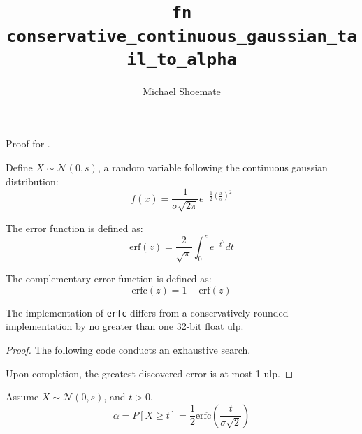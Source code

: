 \documentclass{article}
\title{\texttt{fn conservative\_continuous\_gaussian\_tail\_to\_alpha}}
\author{Michael Shoemate}
\begin{document}
\maketitle

\contrib

Proof for .

\begin{definition}
    \label{gaussian}
    Define $X \sim \mathcal{N}(0, s)$, a random variable following the continuous gaussian distribution:
    \begin{equation}
        f(x) = \frac{1}{\sigma \sqrt{2 \pi}} e^{-\frac{1}{2}\left( \frac{x}{\sigma}\right)^2}
    \end{equation}
\end{definition}

\begin{definition}
    \label{erf}
    The error function is defined as:
    \begin{equation}
        \mathrm{erf}(z) = \frac{2}{\sqrt{\pi}} \int_{0}^{z} e^{-t^2} dt
    \end{equation}
\end{definition}

\begin{definition}
    \label{erfc}
    The complementary error function is defined as:
    \begin{equation}
        \mathrm{erfc}(z) = 1 - \mathrm{erf}(z)
    \end{equation}
\end{definition}

\begin{lemma}
    \label{erfc-err}
    The implementation of \texttt{erfc} differs from a conservatively rounded implementation by no greater than one 32-bit float ulp.
\end{lemma}

\begin{proof}
    The following code conducts an exhaustive search.
    \label{sec:erfc-err-check}
    

    Upon completion, the greatest discovered error is at most 1 ulp.
\end{proof}

\begin{theorem}
    Assume $X \sim \mathcal{N}(0, s)$, and $t > 0$.
    \begin{equation}
        \alpha = P[X \ge t] = \frac{1}{2} \mathrm{erfc}\left(\frac{t}{\sigma \sqrt{2}}\right)
    \end{equation}
\end{theorem}
\end{document}
